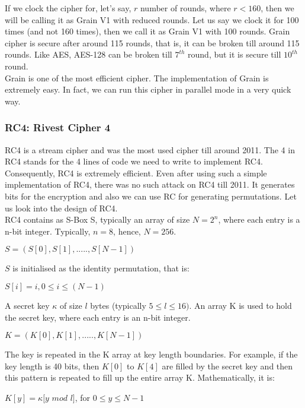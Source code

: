 \documentclass[11pt]{article}
\begin{document}
\newline
If we clock the cipher for, let's say, $r$ number of rounds, where $r < 160$, then we will be calling it as Grain V1 with reduced rounds. Let us say we clock it for 100 times (and not 160 times), then we call it as Grain V1 with 100 rounds. Grain cipher is secure after around 115 rounds, that is, it can be broken till around 115 rounds. Like AES, AES-128 can be broken till $7^{th}$ round, but it is secure till $10^{th}$ round.\\
\newline
Grain is one of the most efficient cipher. The implementation of Grain is extremely easy. In fact, we can run this cipher in parallel mode in a very quick way.

\subsubsection{RC4: Rivest Cipher 4}
RC4 is a stream cipher and was the most used cipher till around 2011. The 4 in RC4 stands for the 4 lines of code we need to write to implement RC4. Consequently, RC4 is extremely efficient. Even after using such a simple implementation of RC4, there was no such attack on RC4 till 2011. It generates bits for the encryption and also we can use RC for generating permutations. Let us look into the design of RC4.\\
\newline
RC4 contains as S-Box S, typically an array of size $N = 2^n$, where each entry is a n-bit integer. Typically, $n = 8$, hence, $N = 256$. 
\begin{center}
    $S = (S[0], S[1],....., S[N-1])$
\end{center}
$S$ is initialised as the identity permutation, that is:
\begin{center}
    $S[i] = i, 0\leq i\leq (N-1)$
\end{center}
A secret key $\kappa$ of size $l$ bytes (typically $5 \leq l \leq 16)$. An array K is used to hold the secret key, where each entry is an n-bit integer.
\begin{center}
    $K = (K[0], K[1],....., K[N-1]) $
\end{center}
The key is repeated in the K array at key length boundaries. For example, if the key length is 40 bits, then $K[0]$ to $K[4]$ are filled by the secret key and then this pattern is repeated to fill up the entire array K. Mathematically, it is:
\begin{center}
    $K[y] = \kappa[y$ $ mod $ $l]$, for $0 \leq y \leq N-1$
\end{center}
\end{document}
